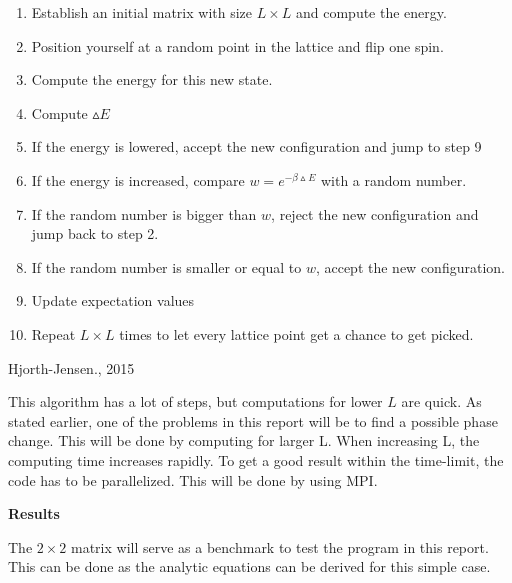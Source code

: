 \documentclass[10pt,a4paper]{article}
\begin{document}
\begin{enumerate}
\item Establish an initial matrix with size $L \times L$ and compute the energy.
\item Position yourself at a random point in the lattice and flip one spin.
\item Compute the energy for this new state.
\item Compute $\vartriangle E$ 
\item If the energy is lowered, accept the new configuration and jump to step 9
\item If the energy is increased, compare $w=e^{-\beta \vartriangle E}$ with a random number.
\item If the random number is bigger than $w$, reject the new configuration and jump back to step 2.
\item If the random number is smaller or equal to $w$, accept the new configuration. 
\item Update expectation values
\item Repeat $L \times L$ times to let every lattice point get a chance to get picked.
\end{enumerate}
\hfill{Hjorth-Jensen., 2015}

\vspace{1cm}
\noindent This algorithm has a lot of steps, but computations for lower $L$ are quick. As stated earlier, one of the problems in this report will be to find a possible phase change. This will be done by computing for larger L. When increasing L, the computing time increases rapidly. To get a good result within the time-limit, the code has to be parallelized. This will be done by using MPI.  














 





\newpage
{\LARGE\bf
Results
}

\noindent The $2\times2$ matrix will serve as a benchmark to test the program in this report. This can be done as the analytic equations can be derived for this simple case.\\ 
\end{document}
